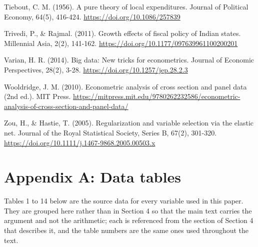 \documentclass[12pt,a4paper]{article}
\begin{document}
\hangindent=0.5in
Tiebout, C. M. (1956). A pure theory of local expenditures. Journal of Political Economy, 64(5), 416-424. \url{https://doi.org/10.1086/257839}

\hangindent=0.5in
Trivedi, P., \& Rajmal. (2011). Growth effects of fiscal policy of Indian states. Millennial Asia, 2(2), 141-162. \url{https://doi.org/10.1177/097639961100200201}

\hangindent=0.5in
Varian, H. R. (2014). Big data: New tricks for econometrics. Journal of Economic Perspectives, 28(2), 3-28. \url{https://doi.org/10.1257/jep.28.2.3}

\hangindent=0.5in
Wooldridge, J. M. (2010). Econometric analysis of cross section and panel data (2nd ed.). MIT Press. \url{https://mitpress.mit.edu/9780262232586/econometric-analysis-of-cross-section-and-panel-data/}

\hangindent=0.5in
Zou, H., \& Hastie, T. (2005). Regularization and variable selection via the elastic net. Journal of the Royal Statistical Society, Series B, 67(2), 301-320. \url{https://doi.org/10.1111/j.1467-9868.2005.00503.x}


\FloatBarrier
\section*{Appendix A: Data tables}
\setcounter{table}{0}

Tables 1 to 14 below are the source data for every variable used in this paper.
They are grouped here rather than in Section 4 so that the main text carries the
argument and not the arithmetic; each is referenced from the section of Section 4
that describes it, and the table numbers are the same ones used throughout the
text.
\end{document}
